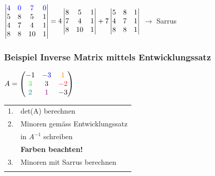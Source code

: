 			
			$\begin{vmatrix}
		    	\color{blue}4 & \color{blue}0 & \color{blue}7 & \color{blue}0 \\
		    	5 & 8 & 5 & 1 \\
		    	4 & 7 & 4 & 1 \\
		    	8 & 8 & 10 & 1 
		    	\end{vmatrix}  =  4 	\begin{vmatrix}
		    						 8 & 5 & 1 \\ 7 & 4 & 1 \\ 8 									& 10 & 1 
								\end{vmatrix} + 7 												\begin{vmatrix}
								5 & 8 & 1 \\ 4 & 7 & 1 \\ 8 & 								8 & 1 
								\end{vmatrix}$ \quad $\rightarrow$ Sarrus \\						 		    
		    
			\subsubsection{Beispiel Inverse Matrix mittels Entwicklungssatz}
			
			$A = \begin{pmatrix}
		    		-1 & \color{blue}-3 & \color{orange}1 \\
		    		\color{green}3 & 3 & \color{red}-2  \\
		    		\color{teal}2 & \color{violet}1 & -3  \\
		    		\end{pmatrix}$  \quad  \begin{tabular}{ll}
		    		1. & det(A) berechnen \\
		    		2. & Minoren gemäss Entwicklungssatz \\
		    		& in $A^{-1}$ schreiben \\
		    		& \textbf{Farben beachten!} \\
		    		3.& Minoren mit Sarrus berechnen \\
		    		\\
					\end{tabular}						

